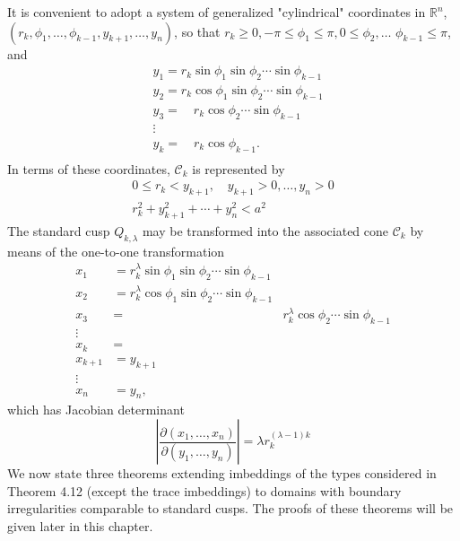 \begin{para}
  It is convenient to adopt a system of generalized "cylindrical" coordinates in $\mathbb{R}^n$, $\left(r_k, \phi_1, \ldots, \phi_{k-1}, y_{k+1}, \ldots, y_n\right)$, so that $r_k \geq 0,-\pi \leq \phi_1 \leq \pi, 0 \leq \phi_2, \ldots$
  $\phi_{k-1} \leq \pi$, and
  \[
  \begin{aligned}
  & y_1=r_k \sin \phi_1 \sin \phi_2 \cdots \sin \phi_{k-1} \\
  & y_2=r_k \cos \phi_1 \sin \phi_2 \cdots \sin \phi_{k-1} \\
  & y_3=\quad r_k \cos \phi_2 \cdots \sin \phi_{k-1} \\
  & \vdots \\
  & y_k=\quad r_k \cos \phi_{k-1} \text {. } \\
  &
  \end{aligned}
  \]
  In terms of these coordinates, $\mathcal{C}_k$ is represented by
  \[
  \begin{gathered}
  0 \leq r_k<y_{k+1}, \quad y_{k+1}>0, \ldots, y_n>0 \\
  r_k^2+y_{k+1}^2+\cdots+y_n^2<a^2
  \end{gathered}
  \]
  The standard cusp $Q_{k, \lambda}$ may be transformed into the associated cone $\mathcal{C}_k$ by means of the one-to-one transformation
  \[
  \begin{array}{rlr}
  x_1 & =r_k^\lambda \sin \phi_1 \sin \phi_2 \cdots \sin \phi_{k-1} \\
  x_2 & =r_k^\lambda \cos \phi_1 \sin \phi_2 \cdots \sin \phi_{k-1} \\
  x_3 & = & r_k^\lambda \cos \phi_2 \cdots \sin \phi_{k-1} \\
  \vdots & \\
  x_k & = & \\
  x_{k+1} & =y_{k+1} & \\
  \vdots & \\
  x_n & =y_n,
  \end{array}
  \]
  which has Jacobian determinant
  \[
  \left|\frac{\partial\left(x_1, \ldots, x_n\right)}{\partial\left(y_1, \ldots, y_n\right)}\right|=\lambda r_k^{(\lambda-1) k}
  \]
  We now state three theorems extending imbeddings of the types considered in Theorem 4.12 (except the trace imbeddings) to domains with boundary irregularities comparable to standard cusps. The proofs of these theorems will be given later in this chapter.
\end{para}


